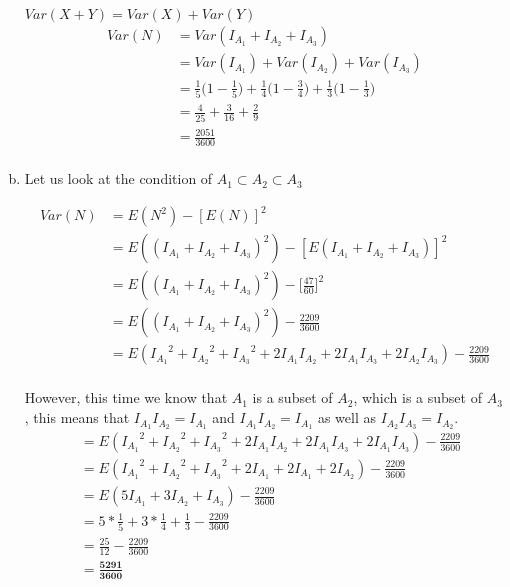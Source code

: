 \documentclass[10pt]{report}
\begin{document}
\begin{enumerate}[(a)]
\begin{center}
  $Var(X+Y) = Var(X) + Var(Y) $
  \begin{align*}
  Var(N) &= Var(I_{A_1} + I_{A_2} + I_{A_3}) \\
  &= Var(I_{A_1}) +Var( I_{A_2}) + Var(I_{A_3}) \\
  & = \frac{1}{5}\bigg(1-\frac{1}{5}\bigg) + \frac{1}{4}\bigg(1-\frac{3}{4}\bigg) + \frac{1}{3}\bigg(1-\frac{1}{3}\bigg) \\
  &= \frac{4}{25} + \frac{3}{16} + \frac{2}{9} \\
  &= \frac{2051}{3600}\\
  \end{align*}
  \end{center}
  \item Let us look at the condition of $A_1 \subset A_2 \subset A_3 $
    \begin{center}
 \begin{align*}
 Var(N) &=E(N^2) - [E(N)]^2 \\
 &=E(( I_{A_1} + I_{A_2} + I_{A_3})^2) - [E( I_{A_1} + I_{A_2} + I_{A_3})]^2 \\
 &= E(( I_{A_1} + I_{A_2} + I_{A_3})^2) - \bigg[\frac{47}{60}\bigg]^2 \\
 &= E(( I_{A_1} + I_{A_2} + I_{A_3})^2) - \frac{2209}{3600} \\
 &=E({I_{A_1}}^2 +{ I_{A_2}}^2 + {I_{A_3}}^2 + 2I_{A_1}I_{A_2} + 2I_{A_1}I_{A_3} + 2I_{A_2}I_{A_3}) - \frac{2209}{3600} \\
 \end{align*}
 \end{center}
 However, this time we know that $A_1 $ is a subset of $A_2 $, which is a subset of $A_3 $, this means that $I_{A_1} I_{A_2} = I_{A_1} $ and $I_{A_1}I_{A_2} = I_{A_1} $ as well as $I_{A_2}I_{A_3} = I_{A_2} $. 
 \begin{align*}
 &= E({I_{A_1}}^2 +{ I_{A_2}}^2 + {I_{A_3}}^2 + 2I_{A_1}I_{A_2} + 2I_{A_1}I_{A_3} + 2I_{A_1}I_{A_3}) - \frac{2209}{3600}  \\
 &=E({I_{A_1}}^2 +{ I_{A_2}}^2 + {I_{A_3}}^2 + 2I_{A_1} + 2I_{A_1} + 2I_{A_2}) - \frac{2209}{3600}  \\
 &= E(5I_{A_1} + 3I_{A_2} + I_{A_3})  - \frac{2209}{3600}\\
 &= 5*\frac{1}{5} + 3*\frac{1}{4} + \frac{1}{3} - \frac{2209}{3600}\\
 &=\frac{25}{12} - \frac{2209}{3600} \\
 &= \mathbf{\frac{5291}{3600}} 
 \end{align*}
 \end{enumerate}
 \setcounter{chapter}{6} 
\setcounter{section}{0}
\end{document}
